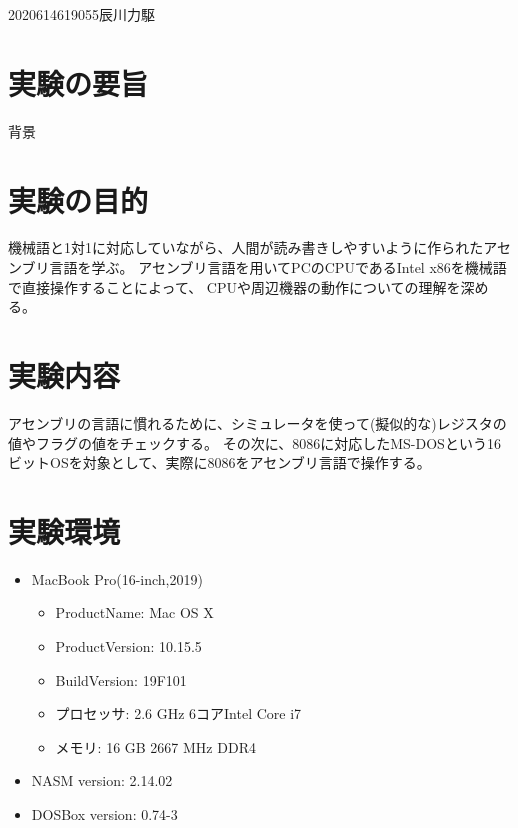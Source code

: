 \documentclass[12pt]{jarticle}
\begin{document}
{2020}{6}{1}{4619055}{辰川力駆}
\section{実験の要旨}
背景


\section{実験の目的}
機械語と1対1に対応していながら、人間が読み書きしやすいように作られたアセンブリ言語を学ぶ。
アセンブリ言語を用いてPCのCPUであるIntel x86を機械語で直接操作することによって、
CPUや周辺機器の動作についての理解を深める。

\section{実験内容}
アセンブリの言語に慣れるために、シミュレータを使って(擬似的な)レジスタの値やフラグの値をチェックする。
その次に、8086に対応したMS-DOSという16ビットOSを対象として、実際に8086をアセンブリ言語で操作する。

\section{実験環境}
\begin{itemize}
	\item MacBook Pro(16-inch,2019)
	      \begin{itemize}
		      \item ProductName: Mac OS X
		      \item ProductVersion:	10.15.5
		      \item BuildVersion: 19F101
		      \item プロセッサ: 2.6 GHz 6コアIntel Core i7
		      \item メモリ: 16 GB 2667 MHz DDR4
	      \end{itemize}
	\item NASM version: 2.14.02
	\item DOSBox version: 0.74-3
\end{itemize}
\end{document}
